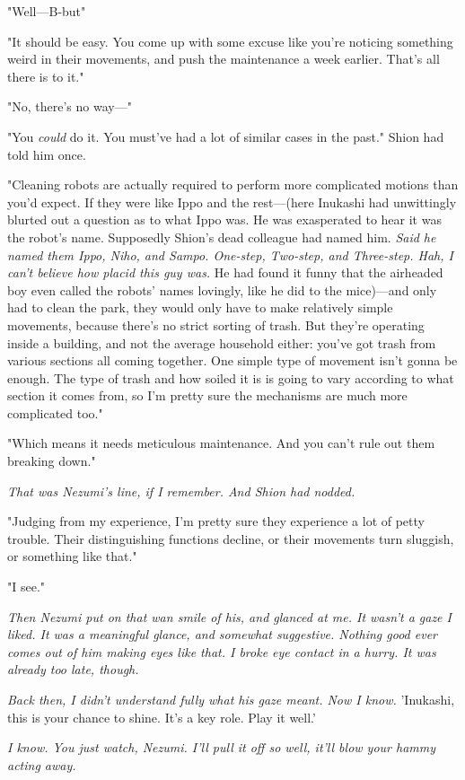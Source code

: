 "Well---B-but\el "

"It should be easy. You come up with some excuse like you're noticing
something weird in their movements, and push the maintenance a week
earlier. That's all there is to it."

"No, there's no way---"

"You \emph{could} do it. You must've had a lot of similar cases in the past."
Shion had told him once.

"Cleaning robots are actually required to perform more complicated
motions than you'd expect. If they were like Ippo and the rest---(here
Inukashi had unwittingly blurted out a question as to what Ippo was. He
was exasperated to hear it was the robot's name. Supposedly Shion's dead
colleague had named him. \emph{Said he named them Ippo, Niho, and Sampo.
One-step, Two-step, and Three-step. Hah, I can't believe how placid this
guy was.} He had found it funny that the airheaded boy even called the
robots' names lovingly, like he did to the mice)---and only had to clean
the park, they would only have to make relatively simple movements,
because there's no strict sorting of trash. But they're operating inside
a building, and not the average household either: you've got trash from
various sections all coming together. One simple type of movement isn't
gonna be enough. The type of trash and how soiled it is is going to vary
according to what section it comes from, so I'm pretty sure the
mechanisms are much more complicated too."~

"Which means it needs meticulous maintenance. And you can't rule out
them breaking down."

\emph{That was Nezumi's line, if I remember. And Shion had nodded.}

"Judging from my experience, I'm pretty sure they experience a lot of
petty trouble. Their distinguishing functions decline, or their
movements turn sluggish, or something like that."

"I see."

\emph{Then Nezumi put on that wan smile of his, and glanced at me. It wasn't a
gaze I liked. It was a meaningful glance, and somewhat suggestive.
Nothing good ever comes out of him making eyes like that. I broke eye
contact in a hurry. It was already too late, though.}

\emph{Back then, I didn't understand fully what his gaze meant. Now I know.}
'Inukashi, this is your chance to shine. It's a key role. Play it well.'

\emph{I know. You just watch, Nezumi. I'll pull it off so well, it'll blow
your hammy acting away.}

